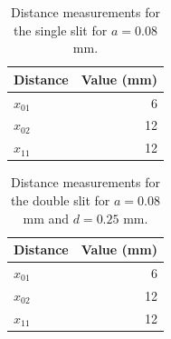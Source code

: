%
\begin{table}[ht!]
	\centering
	\begin{tabular}{l|r}
		\textbf{Distance} & \textbf{Value} (mm) \\
		\hline
		$x_{01}$ & 6 \\
		$x_{02}$ & 12 \\
		$x_{11}$ & 12 \\
		\hline
	\end{tabular}
	\caption{Distance measurements for the single slit for $a = 0.08$ mm.}
	\label{table.10.part1.single}
\end{table}
%
\begin{table}[ht!]
	\centering
	\begin{tabular}{l|r}
		\textbf{Distance} & \textbf{Value} (mm) \\
		\hline
		$x_{01}$ & 6 \\
		$x_{02}$ & 12 \\
		$x_{11}$ & 12 \\
		\hline
	\end{tabular}
	\caption{Distance measurements for the double slit for $a = 0.08$ mm and $d = 0.25$ mm.}
	\label{table.10.part1.double}
\end{table}
%
\newpage
